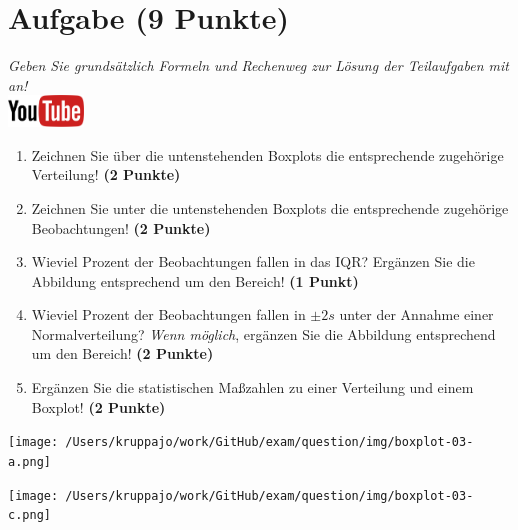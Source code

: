 \documentclass[a4paper, 10pt]{scrartcl}\usepackage[]{graphicx}\usepackage[]{xcolor}
\begin{document}
\section{Aufgabe \hfill (9 Punkte)}

\textit{Geben Sie grunds{\"a}tzlich Formeln und Rechenweg zur L{\"o}sung der
  Teilaufgaben mit an!} \\[1Ex]

\hfill\href{https://youtu.be/Op-gjzASH9I}{\includegraphics[width =
  2cm]{img/youtube}}\\[1Ex]



\begin{enumerate}
\item Zeichnen Sie {\"u}ber die untenstehenden Boxplots die entsprechende
  zugeh{\"o}rige Verteilung! \textbf{(2 Punkte)} 
\item Zeichnen Sie unter die untenstehenden Boxplots die entsprechende
  zugeh{\"o}rige Beobachtungen! \textbf{(2 Punkte)}
\item Wieviel Prozent der Beobachtungen fallen in das IQR? Erg{\"a}nzen Sie die
  Abbildung entsprechend um den Bereich! \textbf{(1 Punkt)}
\item Wieviel Prozent der Beobachtungen fallen in $\pm 2s$ unter
  der Annahme einer Normalverteilung?  \textit{Wenn m{\"o}glich}, erg{\"a}nzen Sie
  die Abbildung entsprechend um den Bereich! \textbf{(2 Punkte)}
\item Erg{\"a}nzen Sie die statistischen Ma{\ss}zahlen zu einer Verteilung und
  einem Boxplot! \textbf{(2 Punkte)}
\end{enumerate}

\vspace*{8cm}

\begin{minipage}[c]{.4\linewidth} %
  \texttt{[image: /Users/kruppajo/work/GitHub/exam/question/img/boxplot-03-a.png]}
\end{minipage}
\hspace{.1\linewidth}%
\begin{minipage}[c]{.4\linewidth} %
  \texttt{[image: /Users/kruppajo/work/GitHub/exam/question/img/boxplot-03-c.png]}
\end{minipage}
\end{document}
